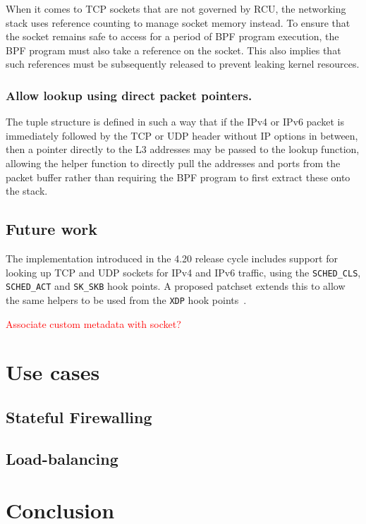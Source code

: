 \documentclass[10pt,sigconf,authorversion]{lpc}
\newcommand\todo[1]{\textcolor{red}{#1}}
\begin{document}
When it comes to TCP sockets that are not governed by RCU, the networking stack
uses reference counting to manage socket memory instead. To ensure that the
socket remains safe to access for a period of BPF program execution, the BPF
program must also take a reference on the socket. This also implies that such
references must be subsequently released to prevent leaking kernel resources.

\subsubsection{Allow lookup using direct packet pointers.}

The tuple structure is defined in such a way that if the IPv4 or IPv6 packet is
immediately followed by the TCP or UDP header without IP options in between,
then a pointer directly to the L3 addresses may be passed to the lookup
function, allowing the helper function to directly pull the addresses and ports
from the packet buffer rather than requiring the BPF program to first extract
these onto the stack.

\subsection{Future work}

The implementation introduced in the 4.20 release cycle includes support for
looking up TCP and UDP sockets for IPv4 and IPv6 traffic, using the
\verb+SCHED_CLS+, \verb+SCHED_ACT+ and \verb+SK_SKB+ hook points. A proposed
patchset extends this to allow the same helpers to be used from the \verb+XDP+
hook points~\cite{sk-lookup-xdp}.

\todo{Associate custom metadata with socket?}

\section{Use cases}

\subsection{Stateful Firewalling}

\subsection{Load-balancing}

\section{Conclusion}
\end{document}
